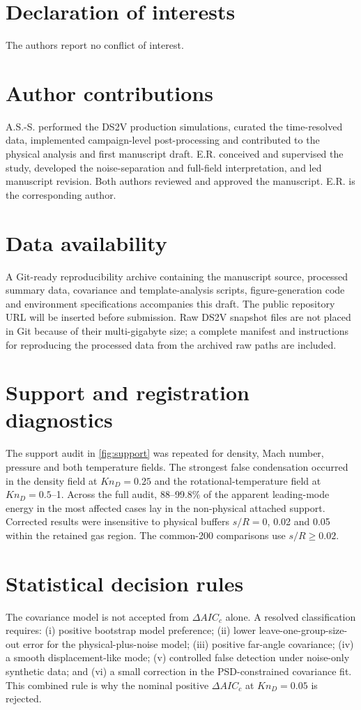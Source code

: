 \documentclass[paper]{JFM-FLM_Au}
\newcommand{\KnD}{Kn_D}
\begin{document}
\section*{Declaration of interests}
The authors report no conflict of interest.

\section*{Author contributions}
A.S.-S. performed the DS2V production simulations, curated the time-resolved data, implemented campaign-level post-processing and contributed to the physical analysis and first manuscript draft. E.R. conceived and supervised the study, developed the noise-separation and full-field interpretation, and led manuscript revision. Both authors reviewed and approved the manuscript. E.R. is the corresponding author.

\section*{Data availability}
A Git-ready reproducibility archive containing the manuscript source, processed summary data, covariance and template-analysis scripts, figure-generation code and environment specifications accompanies this draft. The public repository URL will be inserted before submission. Raw DS2V snapshot files are not placed in Git because of their multi-gigabyte size; a complete manifest and instructions for reproducing the processed data from the archived raw paths are included.

\appendix
\section{Support and registration diagnostics}
The support audit in \cref{fig:support} was repeated for density, Mach number, pressure and both temperature fields. The strongest false condensation occurred in the density field at $\KnD=0.25$ and the rotational-temperature field at $\KnD=0.5$--1. Across the full audit, 88--99.8\% of the apparent leading-mode energy in the most affected cases lay in the non-physical attached support. Corrected results were insensitive to physical buffers $s/R=0$, 0.02 and 0.05 within the retained gas region. The common-200 comparisons use $s/R\geq0.02$.

\section{Statistical decision rules}
The covariance model is not accepted from $\Delta AIC_c$ alone. A resolved classification requires: (i) positive bootstrap model preference; (ii) lower leave-one-group-size-out error for the physical-plus-noise model; (iii) positive far-angle covariance; (iv) a smooth displacement-like mode; (v) controlled false detection under noise-only synthetic data; and (vi) a small correction in the PSD-constrained covariance fit. This combined rule is why the nominal positive $\Delta AIC_c$ at $\KnD=0.05$ is rejected.
\end{document}
